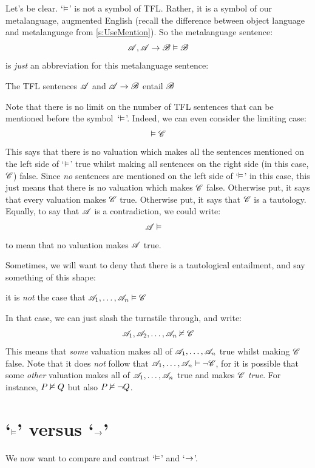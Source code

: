 Let's be clear. `$\vDash$' is not a symbol of TFL. Rather, it is a symbol of our metalanguage, augmented English (recall the difference between object language and metalanguage from \cref{s:UseMention}). So the metalanguage sentence:
	\[\mathscr{A}, \mathscr{A} \rightarrow \mathscr{B} \vDash \mathscr{B}\]
is \emph{just} an abbreviation for this metalanguage sentence: 
	\begin{center}
		The TFL sentences $\mathscr{A}$ and $\mathscr{A} \rightarrow \mathscr{B}$ entail $\mathscr{B}$
	\end{center}
Note that there is no limit on the number of TFL sentences that can be mentioned before the symbol~`$\vDash$'. Indeed, we can even consider the limiting case:
	$$\vDash \mathscr{C}$$
This says that there is no valuation which makes all the sentences
mentioned on the left side of `$\vDash$' true whilst making all
sentences on the right side (in this case, $\mathscr{C}$) false. Since \emph{no} sentences are mentioned on the left
side of `$\vDash$' in this case, this just means that there is no
valuation which makes $\mathscr{C}$ false. Otherwise put, it says that
every valuation makes $\mathscr{C}$ true. Otherwise put, it says that
$\mathscr{C}$ is a tautology. Equally, to say that $\mathscr{A}$ is a
contradiction, we could write:
	$$\metav{A} \entails\phantom{\metav{C}}$$
to mean that no valuation makes $\mathscr{A}$ true.

Sometimes, we will want to deny that there is a tautological entailment, and say something of this shape: 
\begin{center}
	it is \emph{not} the case that $\mathscr{A}_1, \ldots, \mathscr{A}_n \vDash \mathscr{C}$
\end{center}
In that case, we can just slash the turnstile through, and write: 
$$\mathscr{A}_1, \mathscr{A}_2, \ldots, \mathscr{A}_n \nvDash\mathscr{C}$$
This means that \emph{some} valuation makes all of $\mathscr{A}_1,
\ldots, \mathscr{A}_n$ true whilst making $\mathscr{C}$ false. Note that
it does \emph{not} follow that $\mathscr{A}_1,\ldots, \mathscr{A}_n
\vDash \neg \mathscr{C}$, for it is possible that some \emph{other}
valuation makes all of $\mathscr{A}_1, \ldots, \mathscr{A}_n$ true and
makes $\mathscr{C}$ \emph{true}. For instance, $P \nvDash Q$ but also
$P \nvDash \neg Q$.

\section{`$\vDash$' versus `$\rightarrow$'}\label{entails-v-iff}
We now want to compare and contrast `$\vDash$' and `$\rightarrow$'.

